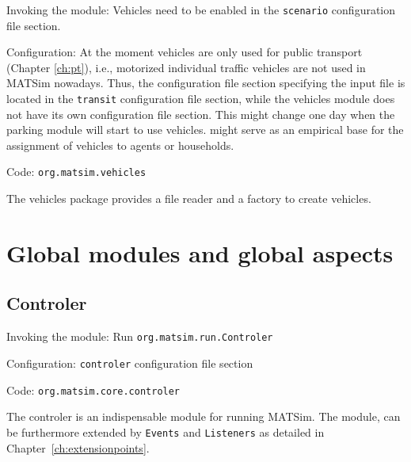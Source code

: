 \begin{compactitem}
\item Invoking the module: Vehicles need to be enabled in the \lstinline|scenario| configuration file section.
\item Configuration: At the moment vehicles are only used for public transport (Chapter \ref{ch:pt}), i.e., motorized individual traffic vehicles are not used in MATSim nowadays. Thus, the configuration file section specifying the input file is located in the \lstinline|transit| configuration file section, while the vehicles module does not have its own configuration file section. 
%
This might change one day when the parking module will start to use vehicles. \citet[][]{JaeggiEtAl_TRR_2012} might serve as an empirical base for the assignment of vehicles to agents or households.
\item Code: \lstinline|org.matsim.vehicles|
\end{compactitem}

The vehicles package provides a file reader and a factory to create vehicles.



\section{Global modules and global aspects}
\label{sec:globalmodules}

\subsection{Controler}
\label{sec:controler}
\begin{compactitem}
\item Invoking the module: Run \lstinline|org.matsim.run.Controler|
\item Configuration: \lstinline|controler| configuration file section
\item Code: \lstinline|org.matsim.core.controler|
\end{compactitem}

The controler is an indispensable module for running MATSim. The module, can be furthermore extended by \lstinline|Events| and \lstinline|Listeners| as detailed in Chapter~\ref{ch:extensionpoints}. 
%

